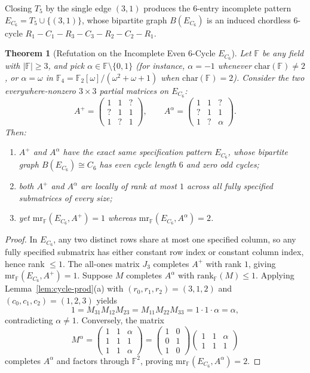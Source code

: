 \documentclass[11pt]{article}
\newtheorem{theorem}{Theorem}[section]
\theoremstyle{definition}
\newcommand{\F}{\mathbb{F}}
\newcommand{\mr}{\mathrm{mr}}
\newcommand{\rk}{\mathrm{rank}}
\begin{document}
Closing $T_5$ by the single edge $(3,1)$ produces the $6$-entry incomplete pattern $E_{C_6} = T_5 \cup \{(3,1)\}$, whose bipartite graph $B(E_{C_6})$ is an induced chordless $6$-cycle $R_1 - C_1 - R_3 - C_3 - R_2 - C_2 - R_1$.

\begin{theorem}[Refutation on the Incomplete Even $6$-Cycle $E_{C_6}$]\label{thm:even-c6}
Let $\F$ be any field with $|\F| \ge 3$, and pick $\alpha \in \F \setminus \{0,1\}$ (for instance, $\alpha = -1$ whenever $\mathrm{char}(\F)\neq 2$, or $\alpha = \omega$ in $\F_4 = \F_2[\omega]/(\omega^2+\omega+1)$ when $\mathrm{char}(\F)=2$). Consider the two everywhere-nonzero $3\times 3$ partial matrices on $E_{C_6}$:
\[
A^+ = \begin{pmatrix} 1 & 1 & ? \\ ? & 1 & 1 \\ 1 & ? & 1 \end{pmatrix}, \qquad
A^\alpha = \begin{pmatrix} 1 & 1 & ? \\ ? & 1 & 1 \\ 1 & ? & \alpha \end{pmatrix}.
\]
Then:
\begin{enumerate}
\item $A^+$ and $A^\alpha$ have the exact same specification pattern $E_{C_6}$, whose bipartite graph $B(E_{C_6}) \cong C_6$ has even cycle length $6$ and zero odd cycles;
\item both $A^+$ and $A^\alpha$ are locally of rank at most $1$ across \emph{all} fully specified submatrices of every size;
\item yet $\mr_{\F}(E_{C_6}, A^+) = 1$ whereas $\mr_{\F}(E_{C_6}, A^\alpha) = 2$.
\end{enumerate}
\end{theorem}
\begin{proof}
In $E_{C_6}$, any two distinct rows share at most one specified column, so any fully specified submatrix has either constant row index or constant column index, hence rank $\le 1$. The all-ones matrix $J_3$ completes $A^+$ with rank $1$, giving $\mr_{\F}(E_{C_6},A^+) = 1$. Suppose $M$ completes $A^\alpha$ with $\rk_{\F}(M)\le 1$. Applying Lemma~\ref{lem:cycle-prod}(a) with $(r_0,r_1,r_2) = (3,1,2)$ and $(c_0,c_1,c_2) = (1,2,3)$ yields
\[
1 = M_{31} M_{12} M_{23} = M_{11} M_{22} M_{33} = 1 \cdot 1 \cdot \alpha = \alpha,
\]
contradicting $\alpha \neq 1$. Conversely, the matrix
\[
M^\alpha = \begin{pmatrix} 1 & 1 & \alpha \\ 1 & 1 & 1 \\ 1 & 1 & \alpha \end{pmatrix}
= \begin{pmatrix} 1 & 0 \\ 0 & 1 \\ 1 & 0 \end{pmatrix}
\begin{pmatrix} 1 & 1 & \alpha \\ 1 & 1 & 1 \end{pmatrix}
\]
completes $A^\alpha$ and factors through $\F^2$, proving $\mr_{\F}(E_{C_6}, A^\alpha) = 2$.
\end{proof}
\end{document}
